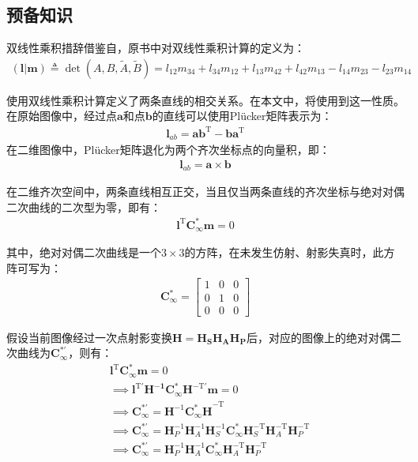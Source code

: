 \documentclass[11pt]{article}
\begin{document}
\subsection{预备知识}
双线性乘积措辞借鉴自\cite{hartley2003multiple}，原书中对双线性乘积计算的定义为：
\begin{align}
  \label{eq:bilinear}
  \mathbf{(l|m)}\triangleq \det(A,B,\tilde{A},\tilde{B})=l_{12}m_{34}+l_{34}m_{12}+l_{13}m_{42}+l_{42}m_{13}-l_{14}m_{23}-l_{23}m_{14}
\end{align}\par
使用双线性乘积计算定义了两条直线的相交关系。在本文中，将使用到这一性质。在原始图像中，经过点$\mathbf{a}$和点$\mathbf{b}$的直线可以使用Plücker矩阵表示为：
\begin{align}
  \label{eq:plucker}
  \mathbf{l}_{ab}=\mathbf{a}\mathbf{b}^\textrm{T}-\mathbf{b}\mathbf{a}^\textrm{T}
\end{align}
在二维图像中，Plücker矩阵退化为两个齐次坐标点的向量积，即：
\begin{align}
  \label{eq:plucker2d}
  \mathbf{l}_{ab}=\mathbf{a}\times\mathbf{b}
\end{align}\par
在二维齐次空间中，两条直线相互正交，当且仅当两条直线的齐次坐标与绝对对偶二次曲线的二次型为零，即有：
\begin{align}
  \mathbf{l^\mathrm{T}C_\infty^*m}=0
\end{align}
\par
其中，绝对对偶二次曲线是一个$3\times3$的方阵，在未发生仿射、射影失真时，此方阵可写为：
\begin{align*}
  \mathbf{C_\infty^*}=\begin{bmatrix}
                        1 & 0 & 0  \\
                        0 & 1 & 0  \\
                        0 & 0 & 0
                      \end{bmatrix}
\end{align*}
\par
假设当前图像经过一次点射影变换$\mathbf{H=H_SH_AH_P}$后，对应的图像上的绝对对偶二次曲线为$\mathbf{C_\infty^{*'}}$，则有：
\begin{align*}
   & \mathbf{l^\mathrm{T}C_\infty^{*}m}=0                                                                                                                                            \\
   & \implies\mathbf{l^\mathrm{T'}H^{-1}C_\infty^{*}H^\mathrm{-T'}m}=0                                                                                                               \\
   & \implies\mathbf{C_\infty^{*'}}=\mathbf{H}^{-1}\mathbf{C_\infty^*H}^{-\textrm{T}}                                                                                                \\
   & \implies\mathbf{C_\infty^{*'}}=\mathbf{H}_P^{-1}\mathbf{H}_A^{-1}\mathbf{H}_S^{-1}\mathbf{C_\infty^{*}}\mathbf{H}_S^\mathrm{-T}\mathbf{H}_A^\mathrm{-T}\mathbf{H}_P^\mathrm{-T} \\
   & \implies\mathbf{C_\infty^{*'}}=\mathbf{H}_P^{-1}\mathbf{H}_A^{-1}\mathbf{C_\infty^{*}}\mathbf{H}_A^\mathrm{-T}\mathbf{H}_P^\mathrm{-T}
\end{align*}
\end{document}
